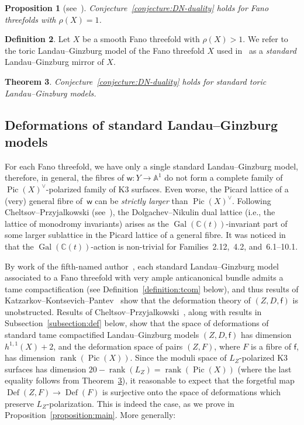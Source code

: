 \documentclass[10pt]{amsart}
\numberwithin{equation}{section}
\theoremstyle{plain}
\newtheorem{theorem}{Theorem}[section]
\newtheorem{proposition}[theorem]{Proposition}
\theoremstyle{definition}
\newtheorem{definition}[theorem]{Definition}
\theoremstyle{remark}
\DeclareMathOperator{\Def}{Def}
\DeclareMathOperator{\Gal}{Gal}
\DeclareMathOperator{\Pic}{Pic}
\DeclareMathOperator{\rk}{rank}
\begin{document}
\begin{proposition}[see~{\cite[Theorem~5.25]{przyjalkowski2018review}}]\label{proposition:prrev}
  Conjecture~\ref{conjecture:DN-duality} holds for Fano threefolds with \(\rho(X) = 1\).
\end{proposition}

\begin{definition}\label{definition:LG-standard}
  Let \(X\) be a smooth Fano threefold with \(\rho(X) > 1\). We refer to the toric Landau--Ginzburg model of the Fano threefold \(X\) used in~\cite{cheltsov2018katzarkov} as a \emph{standard} Landau--Ginzburg mirror of \(X\).
\end{definition}

\begin{theorem}\label{theorem:DN-duality}
  Conjecture~\ref{conjecture:DN-duality} holds for standard toric Landau--Ginzburg models.
\end{theorem}

\subsection{Deformations of standard Landau--Ginzburg models}

For each Fano threefold, we have only a single standard Landau--Ginzburg model, therefore, in general, the fibres of \(\mathsf{w} \colon Y\rightarrow \mathbb{A}^1\) do not form a complete family of \(\Pic(X)^\vee\)-polarized family of K3 surfaces. Even worse, the Picard lattice of a (very) general fibre of~\(\mathsf{w}\) can be \emph{strictly larger} than \(\Pic(X)^\vee\). Following Cheltsov--Przyjalkowski (see~\cite{cheltsov2018katzarkov}), the Dolgachev--Nikulin dual lattice (i.e., the lattice of monodromy invariants) arises as the \(\Gal(\mathbb{C}(t))\)-invariant part of some larger sublattice in the Picard lattice of a general fibre. It was noticed in~\cite{cheltsov2018katzarkov} that the \(\Gal(\mathbb{C}(t))\)-action is non-trivial for Families~2.12,~4.2, and~6.1--10.1.

By work of the fifth-named author~\cite{przyjalkowski2017compactification}, each standard Landau--Ginzburg model associated to a Fano threefold with very ample anticanonical bundle admits a tame compactification (see Definition~\ref{definition:tcom} below), and thus results of Katzarkov--Kontsevich--Pantev~\cite{katzarkov2017bogomolov} show that the deformation theory of \((Z, D, \mathsf{f})\) is unobstructed. Results of Cheltsov--Przyjalkowski~\cite{cheltsov2018katzarkov}, along with results in Subsection~\ref{subsection:def} below, show that the space of deformations of standard tame compactified Landau--Ginzburg models \((Z, D, \mathsf{f})\) has dimension \(h^{1,1}(X) + 2\), and the deformation space of pairs \((Z,F)\), where \(F\) is a fibre of \(\mathsf{f}\), has dimension \(\rk(\Pic(X))\). Since the moduli space of \(L_Z\)-polarized K3 surfaces has dimension \(20 - \rk(L_Z) = \rk(\Pic(X))\) (where the last equality follows from Theorem~\ref{theorem:DN-duality}), it reasonable to expect that the forgetful map \(\Def(Z,F)\rightarrow \Def(F)\) is surjective onto the space of deformations which preserve \(L_Z\)-polarization. This is indeed the case, as we prove in Proposition~\ref{proposition:main}. More generally:
\end{document}
